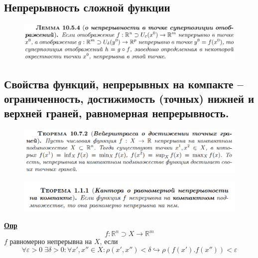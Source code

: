 \documentclass{article}
\newcommand{\R}{\mathbb{R}}
\newcommand{\bb}{\textbf}
\begin{document}
\subsection{Непрерывность сложной функции}
\begin{figure}[h!]
    \centering
    \includegraphics[width=\textwidth]{28.png}
    \vspace{-1cm}
\end{figure}


\newpage
\subsection{Свойства функций, непрерывных на компакте -- ограниченность, достижимость (точных) нижней и верхней граней, равномерная непрерывность.}
\begin{figure}[h!]
    \centering
    \includegraphics[width=\textwidth]{47.png}
    \vspace{-1cm}
\end{figure}
\begin{figure}[h!]
    \centering
    \includegraphics[width=\textwidth]{48.png}
\end{figure}
\underline{\bb{Опр}}
$$f: \R^n \supset X \to \R^m $$
$f$ равномерно непрерывна на $X$, если
$$ \forall \varepsilon > 0 \; \exists \delta > 0 : \forall x', x'' \in X : \rho(x',x'') < \delta \hookrightarrow \rho(f(x'). f(x'')) < \varepsilon $$
\newpage
\end{document}
